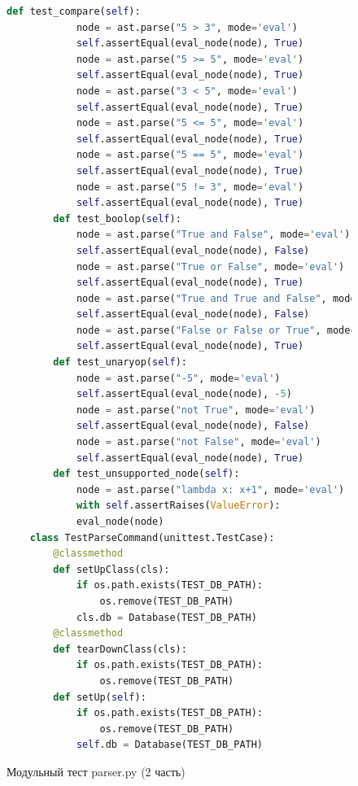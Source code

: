 \begin{figure}[H]
	\begin{lstlisting}[language=Python, breaklines=true]
		def test_compare(self):
			node = ast.parse("5 > 3", mode='eval')
			self.assertEqual(eval_node(node), True)        
			node = ast.parse("5 >= 5", mode='eval')
			self.assertEqual(eval_node(node), True)        
			node = ast.parse("3 < 5", mode='eval')
			self.assertEqual(eval_node(node), True)        
			node = ast.parse("5 <= 5", mode='eval')
			self.assertEqual(eval_node(node), True)        
			node = ast.parse("5 == 5", mode='eval')
			self.assertEqual(eval_node(node), True)        
			node = ast.parse("5 != 3", mode='eval')
			self.assertEqual(eval_node(node), True)
		def test_boolop(self):
			node = ast.parse("True and False", mode='eval')
			self.assertEqual(eval_node(node), False)        
			node = ast.parse("True or False", mode='eval')
			self.assertEqual(eval_node(node), True)        
			node = ast.parse("True and True and False", mode='eval')
			self.assertEqual(eval_node(node), False)        
			node = ast.parse("False or False or True", mode='eval')
			self.assertEqual(eval_node(node), True)
		def test_unaryop(self):
			node = ast.parse("-5", mode='eval')
			self.assertEqual(eval_node(node), -5)        
			node = ast.parse("not True", mode='eval')
			self.assertEqual(eval_node(node), False)        
			node = ast.parse("not False", mode='eval')
			self.assertEqual(eval_node(node), True)
		def test_unsupported_node(self):
			node = ast.parse("lambda x: x+1", mode='eval')
			with self.assertRaises(ValueError):
			eval_node(node)
	class TestParseCommand(unittest.TestCase):
		@classmethod
		def setUpClass(cls):
			if os.path.exists(TEST_DB_PATH):
				os.remove(TEST_DB_PATH)
			cls.db = Database(TEST_DB_PATH)	
		@classmethod
		def tearDownClass(cls):
			if os.path.exists(TEST_DB_PATH):
				os.remove(TEST_DB_PATH)
		def setUp(self):
			if os.path.exists(TEST_DB_PATH):
				os.remove(TEST_DB_PATH)
			self.db = Database(TEST_DB_PATH)
	\end{lstlisting}  
\caption{Модульный тест parser.py (2 часть)}
\label{fig:test_parser_2}
\end{figure}
